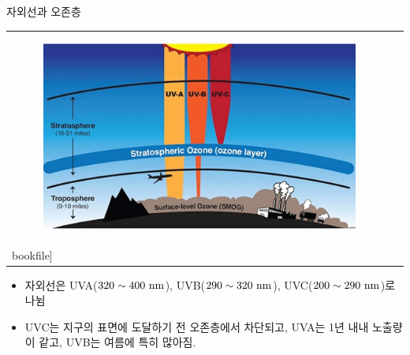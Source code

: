 \begin{frame}[t]{자외선과 오존층}
	\begin{tabular}{ll}
		\begin{minipage}[t]{.5\textwidth}
			\begin{figure}{}
				\includegraphics[width=\textwidth]{./images/file-20180418-163998-h02rtb} 
			\end{figure}
		\end{minipage}
		&
		\begin{minipage}[t]{.45\textwidth}
			\begin{figure}{}
				\texttt{[image: \\bookfile]} 
			\end{figure} 
		\end{minipage}
	\end{tabular}
	\begin{itemize}\scriptsize
		\item 자외선은 UVA($320 \sim 400 \rm{~nm}$), UVB($290 \sim 320 \rm{~nm}$), UVC($200 \sim 290 \rm{~nm}$)로 나뉨
		\item UVC는 지구의 표면에 도달하기 전 오존층에서 차단되고, UVA는 1년 내내 노출량이 같고, UVB는 여름에 특히 많아짐.
	\end{itemize}
\end{frame}



